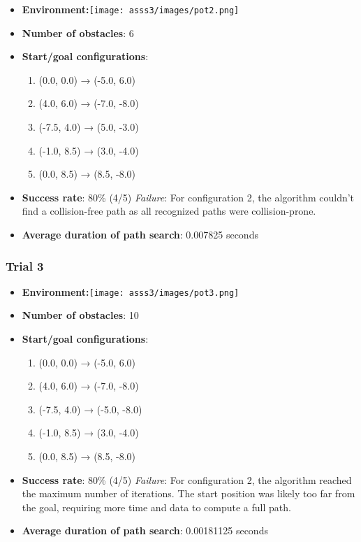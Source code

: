 \documentclass{article}
\begin{document}
\begin{itemize}
    \item \textbf{Environment:}\texttt{[image: asss3/images/pot2.png]}
    \item \textbf{Number of obstacles}: 6
    \item \textbf{Start/goal configurations}: 
    \begin{enumerate}
        \item (0.0, 0.0) → (-5.0, 6.0)
        \item (4.0, 6.0) → (-7.0, -8.0)
        \item (-7.5, 4.0) → (5.0, -3.0)
        \item (-1.0, 8.5) → (3.0, -4.0)
        \item (0.0, 8.5) → (8.5, -8.0)
    \end{enumerate}
    \item \textbf{Success rate}: 80\% (4/5) 
\textit{Failure}: For configuration 2, the algorithm couldn't find a collision-free path as all recognized paths were collision-prone.

    \item \textbf{Average duration of path search}: 0.007825 seconds
\end{itemize}

\subsubsection{Trial 3}

\begin{itemize}
    \item \textbf{Environment:}\texttt{[image: asss3/images/pot3.png]}
    \item \textbf{Number of obstacles}: 10
    \item \textbf{Start/goal configurations}: 
    \begin{enumerate}
        \item (0.0, 0.0) → (-5.0, 6.0)
        \item (4.0, 6.0) → (-7.0, -8.0)
        \item (-7.5, 4.0) → (-5.0, -8.0)
        \item (-1.0, 8.5) → (3.0, -4.0)
        \item (0.0, 8.5) → (8.5, -8.0)
    \end{enumerate}
    \item \textbf{Success rate}: 80\% (4/5) 
\textit{Failure}: For configuration 2, the algorithm reached the maximum number of iterations. The start position was likely too far from the goal, requiring more time and data to compute a full path.

    \item \textbf{Average duration of path search}: 0.00181125 seconds
\end{itemize}
\end{document}
